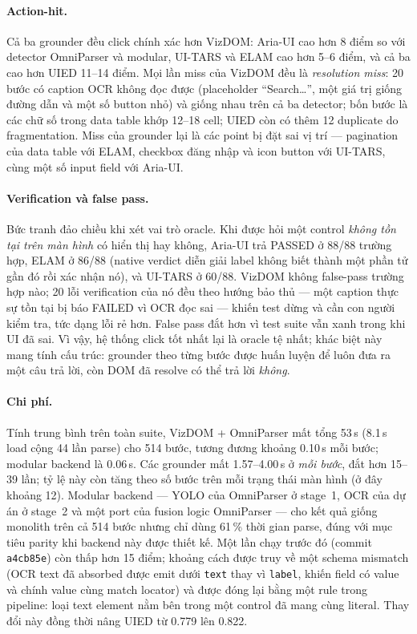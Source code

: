 \documentclass[11pt,a4paper]{article}
\newcommand{\code}[1]{\texttt{#1}}
\begin{document}
\paragraph{Action-hit.} Cả ba grounder đều click chính xác hơn VizDOM: Aria-UI cao
hơn 8 điểm so với detector OmniParser và modular, UI-TARS và ELAM cao hơn 5--6 điểm,
và cả ba cao hơn UIED 11--14 điểm. Mọi lần miss của VizDOM đều là \emph{resolution
miss}: 20 bước có caption OCR không đọc được (placeholder ``Search\ldots'', một giá
trị giống đường dẫn và một số button nhỏ) và giống nhau trên cả ba detector; bốn bước
là các chữ số trong data table khớp 12--18 cell; UIED còn có thêm 12 duplicate do
fragmentation. Miss của grounder lại là các point bị đặt sai vị trí --- pagination của
data table với ELAM, checkbox đăng nhập và icon button với UI-TARS, cùng một số input
field với Aria-UI.

\paragraph{Verification và false pass.} Bức tranh đảo chiều khi xét vai trò oracle.
Khi được hỏi một control \emph{không tồn tại trên màn hình} có hiển thị hay không,
Aria-UI trả PASSED ở 88/88 trường hợp, ELAM ở 86/88 (native verdict diễn giải label
không biết thành một phần tử gần đó rồi xác nhận nó), và UI-TARS ở 60/88. VizDOM không
false-pass trường hợp nào; 20 lỗi verification của nó đều theo hướng bảo thủ --- một
caption thực sự tồn tại bị báo FAILED vì OCR đọc sai --- khiến test dừng và cần con
người kiểm tra, tức dạng lỗi rẻ hơn. False pass đắt hơn vì test suite vẫn xanh trong
khi UI đã sai. Vì vậy, hệ thống click tốt nhất lại là oracle tệ nhất; khác biệt này
mang tính cấu trúc: grounder theo từng bước được huấn luyện để luôn đưa ra một câu trả
lời, còn DOM đã resolve có thể trả lời \emph{không}.

\paragraph{Chi phí.} Tính trung bình trên toàn suite, VizDOM + OmniParser mất tổng
53\,s (8.1\,s load cộng 44 lần parse) cho 514 bước, tương đương khoảng 0.10\,s mỗi
bước; modular backend là 0.06\,s. Các grounder mất 1.57--4.00\,s ở \emph{mỗi bước},
đắt hơn 15--39 lần; tỷ lệ này còn tăng theo số bước trên mỗi trạng thái màn hình
(ở đây khoảng 12). Modular backend --- YOLO của OmniParser ở stage~1, OCR của dự án
ở stage~2 và một port của fusion logic OmniParser --- cho kết quả giống monolith trên
cả 514 bước nhưng chỉ dùng 61\,\% thời gian parse, đúng với mục tiêu parity khi backend
này được thiết kế. Một lần chạy trước đó (commit \code{a4cb85e}) còn thấp hơn 15 điểm;
khoảng cách được truy về một schema mismatch (OCR text đã absorbed được emit dưới
\code{text} thay vì \code{label}, khiến field có value và chính value cùng match
locator) và được đóng lại bằng một rule trong pipeline: loại text element nằm bên
trong một control đã mang cùng literal. Thay đổi này đồng thời nâng UIED từ 0.779 lên
0.822.
\end{document}
